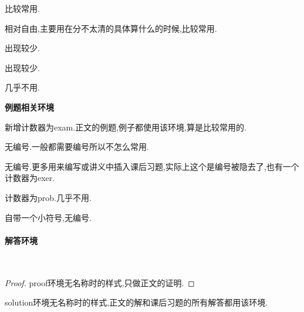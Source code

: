 \documentclass[lang=cn,12pt,scheme=chinese,mode=simple,black]{elegantbook}
\begin{document}
\begin{corollary}[corollary环境]
    比较常用.
\end{corollary}
\begin{proposition}[proposition环境]
    相对自由,主要用在分不太清的具体算什么的时候,比较常用.
\end{proposition}

\begin{notation}[notation环境]
    出现较少.
\end{notation}
\begin{axiom}[axiom环境]
    出现较少.
\end{axiom}

\begin{postulate}[postulate环境]
    几乎不用.
\end{postulate}

\textbf{例题相关环境}

\begin{example}[example环境]
    新增计数器为exam.正文的例题,例子都使用该环境,算是比较常用的.
\end{example}

\begin{example*}[example*环境]
    无编号.一般都需要编号所以不怎么常用.
\end{example*}

\begin{exercise}[exercise环境]
    无编号.更多用来编写或讲义中插入课后习题,实际上这个是编号被隐去了,也有一个计数器为exer.
\end{exercise}

\begin{problem}[problem环境]
计数器为prob.几乎不用.
\end{problem}

\begin{homework}[homework名称]
    自带一个小符号,无编号.
\end{homework}

\paragraph*{解答环境}\

\begin{proof}
    proof环境无名称时的样式,只做正文的证明.
\end{proof}
\begin{solution}
    solution环境无名称时的样式,正文的解和课后习题的所有解答都用该环境.
\end{solution}
\end{document}
